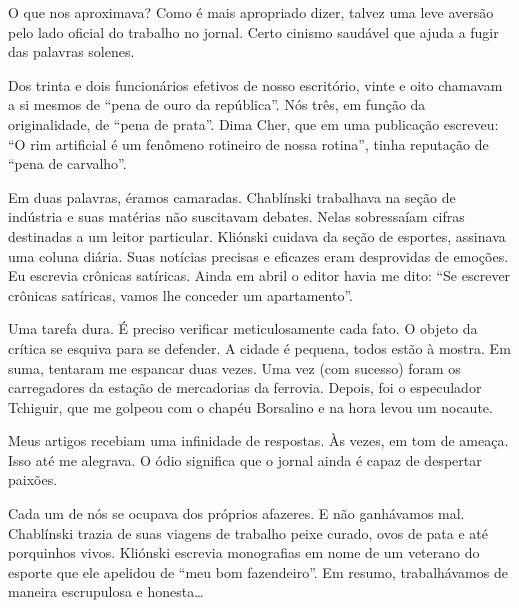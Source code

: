 O que nos aproximava? Como é mais apropriado dizer, talvez uma leve
aversão pelo lado oficial do trabalho no jornal. Certo cinismo saudável
que ajuda a fugir das palavras solenes.

Dos trinta e dois funcionários efetivos de nosso escritório, vinte e
oito chamavam a si mesmos de ``pena de ouro da república''. Nós três, em
função da originalidade, de ``pena de prata''. Dima Cher, que em uma
publicação escreveu: ``O rim artificial é um fenômeno rotineiro de
nossa rotina'', tinha reputação de ``pena de carvalho''.

Em duas palavras, éramos camaradas. Chablínski trabalhava na seção de
indústria e suas matérias não suscitavam debates. Nelas sobressaíam
cifras destinadas a um leitor particular. Kliónski cuidava da seção de
esportes, assinava uma coluna diária. Suas notícias precisas e eficazes
eram desprovidas de emoções. Eu escrevia crônicas satíricas. Ainda em abril o editor havia me dito: ``Se escrever
crônicas satíricas, vamos lhe conceder um apartamento''.

Uma tarefa dura. É preciso verificar meticulosamente cada fato. O objeto
da crítica se esquiva para se defender. A cidade é pequena, todos estão
à mostra. Em suma, tentaram me espancar duas vezes. Uma vez (com
sucesso) foram os carregadores da estação de mercadorias da ferrovia. Depois, foi o
especulador Tchiguir, que me golpeou com o chapéu Borsalino e na hora
levou um nocaute.

Meus artigos recebiam uma infinidade de respostas. Às vezes, em tom de
ameaça. Isso até me alegrava. O ódio significa que o jornal ainda é
capaz de despertar paixões.

Cada um de nós se ocupava dos próprios afazeres. E não ganhávamos mal.
Chablínski trazia de suas viagens de trabalho peixe curado, ovos de pata
e até porquinhos vivos. Kliónski escrevia monografias em nome de um
veterano do esporte que ele apelidou de ``meu bom fazendeiro''. Em
resumo, trabalhávamos de maneira escrupulosa e honesta\ldots{}

\bigskip

